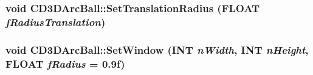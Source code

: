 \label{class_c_d3_d_arc_ball_ad3140af4e1b4f62a18238ac2991de9a6}
\hypertarget{class_c_d3_d_arc_ball_a72c32f8aa6d34f89765ea75139f65b87}{
\subsubsection[{SetTranslationRadius}]{\setlength{\rightskip}{0pt plus 5cm}void CD3DArcBall::SetTranslationRadius (FLOAT {\em fRadiusTranslation})}}
\label{class_c_d3_d_arc_ball_a72c32f8aa6d34f89765ea75139f65b87}
\hypertarget{class_c_d3_d_arc_ball_aac7e91ff2fb6770b18b62b7eaecba6c4}{
\subsubsection[{SetWindow}]{\setlength{\rightskip}{0pt plus 5cm}void CD3DArcBall::SetWindow (INT {\em nWidth}, \/  INT {\em nHeight}, \/  FLOAT {\em fRadius} = {\ttfamily 0.9f})}}
\label{class_c_d3_d_arc_ball_aac7e91ff2fb6770b18b62b7eaecba6c4}


